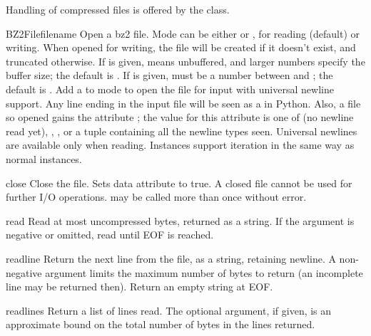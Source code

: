 Handling of compressed files is offered by the  class.

\begin{classdesc}{BZ2File}{filename}
Open a bz2 file. Mode can be either  or , for reading 
(default) or writing. When opened for writing, the file will be created if
it doesn't exist, and truncated otherwise. If  is given,
 means unbuffered, and larger numbers specify the buffer size;
the default is . If
 is given, must be a number between  and
; the default is .
Add a  to mode to open the file for input with universal newline
support. Any line ending in the input file will be seen as a
 in Python.  Also, a file so opened gains the
attribute ; the value for this attribute is one of
 (no newline read yet), , ,
 or a tuple containing all the newline types
seen. Universal newlines are available only when reading.
Instances support iteration in the same way as normal 
instances.
\end{classdesc}

\begin{methoddesc}[BZ2File]{close}{}
Close the file. Sets data attribute  to true. A closed file
cannot be used for further I/O operations.  may be called
more than once without error.
\end{methoddesc}

\begin{methoddesc}[BZ2File]{read}{}
Read at most  uncompressed bytes, returned as a string. If the
 argument is negative or omitted, read until EOF is reached.
\end{methoddesc}

\begin{methoddesc}[BZ2File]{readline}{}
Return the next line from the file, as a string, retaining newline.
A non-negative  argument limits the maximum number of bytes to
return (an incomplete line may be returned then). Return an empty
string at EOF.
\end{methoddesc}

\begin{methoddesc}[BZ2File]{readlines}{}
Return a list of lines read. The optional  argument, if given,
is an approximate bound on the total number of bytes in the lines returned.
\end{methoddesc}

